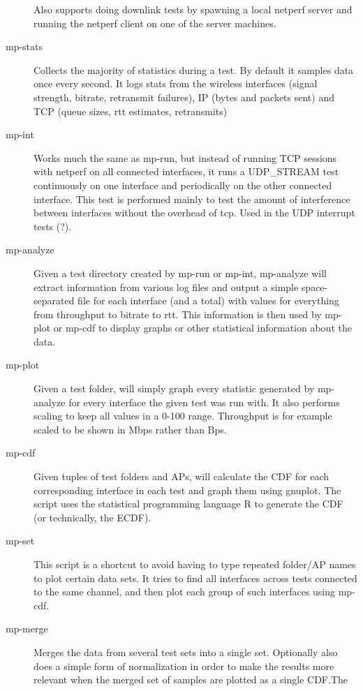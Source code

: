 \begin{description}
    Also supports doing downlink tests by spawning a local netperf server and
    running the netperf client on one of the server machines.
  \item[mp-stats]
    Collects the majority of statistics during a test. By default it samples
    data once every second. It logs stats from the wireless interfaces (signal
    strength, bitrate, retransmit failures), IP (bytes and packets sent) and TCP
    (queue sizes, rtt estimates, retransmits)
  \item[mp-int]
    Works much the same as mp-run, but instead of running TCP sessions with
    netperf on all connected interfaces, it runs a UDP\_STREAM test continuously
    on one interface and periodically on the other connected interface. This 
    test is performed mainly to test the amount of interference between 
    interfaces without the overhead of tcp. Used in the UDP interrupt tests (?).
  \item[mp-analyze]
    Given a test directory created by mp-run or mp-int, mp-analyze will extract
    information from various log files and output a simple space-separated file
    for each interface (and a total) with values for everything from throughput
    to bitrate to rtt. This information is then used by mp-plot or mp-cdf to
    display graphs or other statistical information about the data.
  \item[mp-plot]
    Given a test folder, will simply graph every statistic generated by
    mp-analyze for every interface the given test was run with. It also performs
    scaling to keep all values in a 0-100 range. Throughput is for example
    scaled to be shown in Mbps rather than Bps.
  \item[mp-cdf]
    Given tuples of test folders and APs, will calculate the CDF for each
    corresponding interface in each test and graph them using gnuplot. The
    script uses the statistical programming language R to generate the CDF (or
    technically, the ECDF).
  \item[mp-set]
    This script is a shortcut to avoid having to type repeated folder/AP
    names to plot certain data sets. It tries to find all interfaces across
    tests connected to the same channel, and then plot each group of such
    interfaces using mp-cdf.
  \item[mp-merge]
    Merges the data from several test sets into a single set. Optionally also
    does a simple form of normalization in order to make the results more
    relevant when the merged set of samples are plotted as a single CDF.\@ The

\end{description}
